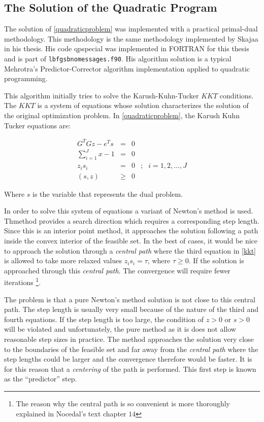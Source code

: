 \subsection{The Solution of the Quadratic Program}

The solution of \ref{quadraticproblem} was implemented with a practical primal-dual methodology. This methodology is the same methodology implemented by Skajaa \citep{skajaa} in his thesis. His code \textsf{qpspecial} was implemented in \textsc{FORTRAN} for this thesis and is part of \texttt{lbfgsbnomessages.f90}. His algorithm solution is a typical Mehrotra's Predictor-Corrector algorithm implementation applied to quadratic programming.

This algorithm initially tries to solve the Karush-Kuhn-Tucker $KKT$ conditions. The $KKT$ is a system of equations whose solution characterizes the solution of the original optimization problem. In \ref{quadraticproblem}, the Karush Kuhn Tucker equations are:

\begin{equation} \label{kkt}
  \begin{aligned}
    G^TGz - e^Ts
    & = & 0 & \\
    \sum_{i = 1}^J x - 1
    & = & 0 & \\
    z_is_i & = & 0 &; &i = 1,2, \dots, J\\
    (s, z) & \geq & 0 &
  \end{aligned}
\end{equation}

Where $s$ is the variable that represents the dual problem.

In order to solve this system of equations a variant of Newton's method is used. Thmethod provides a search direction which requires a corresponding step length.  Since this is an interior point method, it approaches the solution following a path inside the convex interior of the feasible set.  In the best of cases, it would be nice to approach the solution through a \emph{central path} where the third equation in \ref{kkt} is allowed to take more relaxed values $z_is_i = \tau$, where $\tau \geq 0$. If the solution is approached through this \emph{central path}. The convergence will require fewer iterations \footnote{The reason why the central path is so convenient is more thoroughly explained in Nocedal's text chapter $14$\citep{nocedal}}.

The problem is that a pure Newton's method solution is not close to this central path. The step length is usually very small because of the nature of the third and fourth equations. If the step length is too large, the condition of $z > 0$ or $s > 0$ will be violated and unfortunately, the pure method as it is does not allow reasonable step sizes in practice. The method approaches the solution very close to the boundaries of the feasible set and far away from the \emph{central path} where the step lengths could be larger and the convergence therefore would be faster. It is for this reason that a \emph{centering} of the path is performed. This first step is known as the ``predictor'' step.

